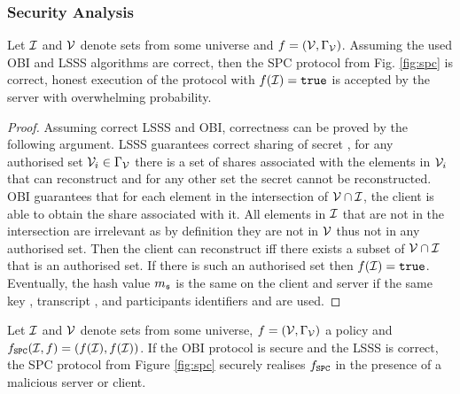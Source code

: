 \subsubsection{Security Analysis}
\begin{lemma}[Correctness]\label{lem:correct}
  Let $\mathcal{I}$ and $\mathcal{V}$ denote sets from some universe and $f=(\mathcal{V},\Gamma_\mathcal{V})$.
  Assuming the used \ac{OBI} and \ac{LSSS} algorithms are correct, then the \ac{SPC} protocol from Fig. \ref{fig:spc} is correct, \ie honest execution of the protocol with $f(\mathcal{I}) = \mathtt{true}$ is accepted by the server with overwhelming probability.\end{lemma}
\begin{proof}
Assuming correct \ac{LSSS} and \ac{OBI}, correctness can be proved by the following argument.
LSSS guarantees correct sharing of secret \secret, \ie for any authorised set $\mathcal{V}_i\in \Gamma_\mathcal{V}$ there is a set of shares associated with the elements in $\mathcal{V}_i$ that can reconstruct \secret and for any other set the secret cannot be reconstructed. 
OBI guarantees that for each element in the intersection of $\mathcal{V}\cap \mathcal{I}$, the client is able to obtain the share associated with it. 
All elements in $\mathcal{I}$ that are not in the intersection are irrelevant as by definition they are not in $\mathcal{V}$ thus not in any authorised set. 
Then the client can reconstruct \secret iff there exists a subset of $\mathcal{V}\cap \mathcal{I}$ that is an authorised set. 
If there is such an authorised set then $f(\mathcal{I})=\mathtt{true}$. Eventually, the hash value $m_\mathfrak{s}$ is the same on the client and server if the same key \secret, transcript \trans, and participants identifiers \Client and \Server are used.
\end{proof}

\begin{lemma}[Privacy]\label{lem:SPCprivacy}
 Let $\mathcal{I}$ and $\mathcal{V}$ denote sets from some universe, $f=(\mathcal{V},\Gamma_\mathcal{V})$ a policy and $f_\mathtt{SPC}(\mathcal{I}, f)=(f(\mathcal{I}), f(\mathcal{I}))$. 
 If the \ac{OBI} protocol is secure and the \ac{LSSS} is correct, the \ac{SPC} protocol from Figure \ref{fig:spc} securely realises $f_\mathtt{SPC}$ in the presence of a malicious server or client.
\end{lemma}

